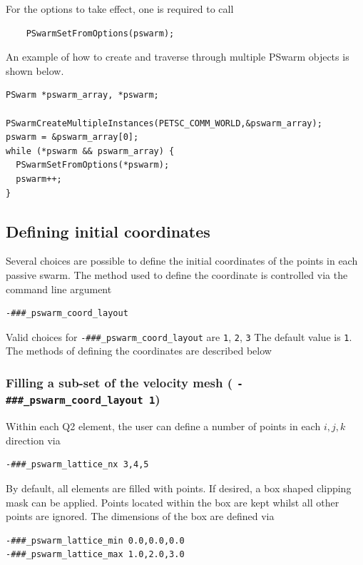 \documentclass[paper=a4, fontsize=10pt,twoside]{scrartcl}
\begin{document}
{{For the options to take effect, one is required to call
\begin{lstlisting}
    PSwarmSetFromOptions(pswarm);
\end{lstlisting}
An example of how to create and traverse through multiple PSwarm objects is shown below.
\begin{lstlisting}
PSwarm *pswarm_array, *pswarm;

PSwarmCreateMultipleInstances(PETSC_COMM_WORLD,&pswarm_array);
pswarm = &pswarm_array[0];
while (*pswarm && pswarm_array) {
  PSwarmSetFromOptions(*pswarm);
  pswarm++;
}
\end{lstlisting}



\subsection{Defining initial coordinates}

Several choices are possible to define the initial coordinates of the points in each passive swarm.
The method used to define the coordinate is controlled via the command line argument
\begin{lstlisting}
-###_pswarm_coord_layout
\end{lstlisting}

Valid choices for \texttt{-\#\#\#\_pswarm\_coord\_layout} are \texttt{1}, \texttt{2}, \texttt{3}
The default value is \texttt{1}.
The methods of defining the coordinates are described below


\subsubsection{Filling a sub-set of the velocity mesh ( \texttt{-\#\#\#\_pswarm\_coord\_layout 1})}

Within each Q2 element, the user can define a number of points in each $i,j,k$ direction via
\begin{lstlisting}
-###_pswarm_lattice_nx 3,4,5
\end{lstlisting}

By default, all elements are filled with points.
If desired, a box shaped clipping mask can be applied. Points located within the box are kept
whilst all other points are ignored. The dimensions of the box are defined via
\begin{lstlisting}
-###_pswarm_lattice_min 0.0,0.0,0.0
-###_pswarm_lattice_max 1.0,2.0,3.0
\end{lstlisting}

}}
\end{document}
